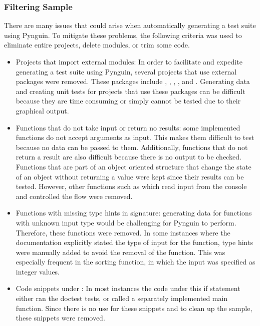 \subsubsection{Filtering Sample}
\label{subsubsec:filtering_sample}

There are many issues that could arise when automatically generating a test
suite using Pynguin. To mitigate these problems, the following criteria was used
to eliminate entire projects, delete modules, or trim some code.

\begin{itemize}
    \item Projects that import external modules: In order to facilitate and
    expedite generating a test suite using Pynguin, several projects that use
    external packages were removed. These packages include ,
    , , , and .
    Generating data and creating unit tests for projects that use these
    packages can be difficult because they are time consuming or simply cannot
    be tested due to their graphical output.
    \item Functions that do not take input or return no results: some implemented
    functions do not accept arguments as input. This makes them difficult to
    test because no data can be passed to them. Additionally, functions that do
    not return a result are also difficult because there is no output to be
    checked. Functions that are part of an object oriented structure that change
    the state of an object without returning a value were kept since their
    results can be tested. However, other functions such as  which
    read input from the console and controlled the flow were removed.
    \item Functions with missing type hints in signature: generating data for
    functions with unknown input type would be challenging for Pynguin to
    perform. Therefore, these functions were removed. In some instances where
    the documentation explicitly stated the type of input for the function, type
    hints were manually added to avoid the removal of the function. This was
    especially frequent in the sorting function, in which the input was specified as
    integer values.
    \item Code snippets under : In most
    instances the code under this if statement either ran the doctest tests, or
    called a separately implemented main function. Since there is no use for
    these snippets and to clean up the sample, these snippets were removed.
\end{itemize}


